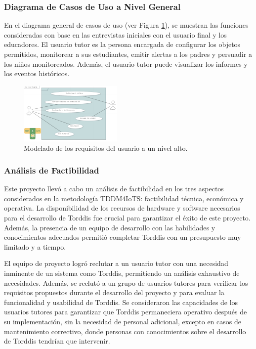 \documentclass[a4paper,fleqn]{cas-sc}
\begin{document}
	\subsubsection{Diagrama de Casos de Uso a Nivel General}
	En el diagrama general de casos de uso (ver Figura \ref{fig:UseCaseDiagram}), se muestran las funciones consideradas con base en las entrevistas iniciales con el usuario final y los educadores. El usuario tutor es la persona encargada de configurar los objetos permitidos, monitorear a sus estudiantes, emitir alertas a los padres y persuadir a los niños monitoreados. Además, el usuario tutor puede visualizar los informes y los eventos históricos.
	
	\begin{figure}[hbt!]
		\centering
		\includegraphics[frame,scale=0.5, width=\linewidth]{figs/Figure_4}
		\caption{Modelado de los requisitos del usuario a un nivel alto.\label{fig:UseCaseDiagram}}
	\end{figure} 
	
	\subsubsection{Análisis de Factibilidad}
	Este proyecto llevó a cabo un análisis de factibilidad en los tres aspectos considerados en la metodología TDDM4IoTS: factibilidad técnica, económica y operativa. La disponibilidad de los recursos de hardware y software necesarios para el desarrollo de Torddis fue crucial para garantizar el éxito de este proyecto. Además, la presencia de un equipo de desarrollo con las habilidades y conocimientos adecuados permitió completar Torddis con un presupuesto muy limitado y a tiempo.
	
	El equipo de proyecto logró reclutar a un usuario tutor con una necesidad inminente de un sistema como Torddis, permitiendo un análisis exhaustivo de necesidades. Además, se reclutó a un grupo de usuarios tutores para verificar los requisitos propuestos durante el desarrollo del proyecto y para evaluar la funcionalidad y usabilidad de Torddis. Se consideraron las capacidades de los usuarios tutores para garantizar que Torddis permaneciera operativo después de su implementación, sin la necesidad de personal adicional, excepto en casos de mantenimiento correctivo, donde personas con conocimientos sobre el desarrollo de Torddis tendrían que intervenir.
	
\end{document}
